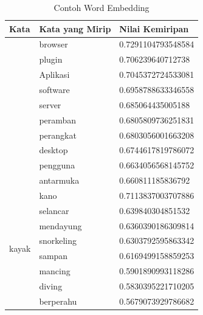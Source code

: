 \begin{enumerate}
  \begin{longtable}[c]{|l|l|l|}
    \caption{Contoh Word Embedding}
    \label{tab:contoh_word_embedding}                                     \\
    \hline
    Kata                          & Kata yang Mirip & Nilai Kemiripan     \\ \hline
    \endhead
    \hline
    \endfoot
    \multirow[t]{10}{*}{aplikasi} & browser         & 0.7291104793548584  \\ \cline{2-3}
                                  & plugin          & 0.706239640712738   \\ \cline{2-3}
                                  & Aplikasi        & 0.7045372724533081  \\ \cline{2-3}
                                  & software        & 0.6958788633346558  \\ \cline{2-3}
                                  & server          & 0.685064435005188   \\ \cline{2-3}
                                  & peramban        & 0.6805809736251831  \\ \cline{2-3}
                                  & perangkat       & 0.6803056001663208  \\ \cline{2-3}
                                  & desktop         & 0.6744617819786072  \\ \cline{2-3}
                                  & pengguna        & 0.6634056568145752  \\ \cline{2-3}
                                  & antarmuka       & 0.660811185836792   \\ \hline
    \multirow[t]{10}{*}{kayak}    & kano            & 0.7113837003707886  \\ \cline{2-3}
                                  & selancar        & 0.639840304851532   \\ \cline{2-3}
                                  & mendayung       & 0.6360390186309814  \\ \cline{2-3}
                                  & snorkeling      & 0.6303792595863342  \\ \cline{2-3}
                                  & sampan          & 0.6169499158859253  \\ \cline{2-3}
                                  & mancing         & 0.5901890993118286  \\ \cline{2-3}
                                  & diving          & 0.5830395221710205  \\ \cline{2-3}
                                  & berperahu       & 0.5679073929786682  \\ \cline{2-3}

\end{longtable}
\end{enumerate}
